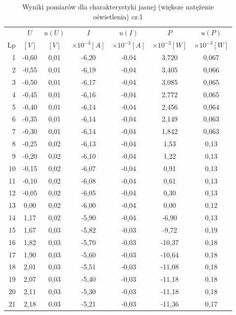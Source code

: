 \documentclass[polish, 11pt, a4paper]{article}
\begin{document}
		\begin{table}[H]
			\centering
			\caption{Wyniki pomiarów dla charakterystyki jasnej (większe natężenie oświetlenia) cz.1}
			\begin{tabular}{|r|c|c|c|c|c|c|}\hline
				&	\(U\)	&	\(u(U)\)	&	\(I\)	&	\(u(I)\)	&	\(P\)	&	\(u(P)\)	\\
				Lp	&	\([V]\)	&	\([V]\)	&	\(\times10^{-3} [A]\)	&	\(\times10^{-3} [A]\)	&	\(\times10^{-3} [W]\)	&	\(\times10^{-3} [W]\)	\\\hline
				1	&	-0,60	&	0,01	&	-6,20	&	-0,04	&	3,720	&	0,067	\\\hline
				2	&	-0,55	&	0,01	&	-6,19	&	-0,04	&	3,405	&	0,066	\\\hline
				3	&	-0,50	&	0,01	&	-6,17	&	-0,04	&	3,085	&	0,065	\\\hline
				4	&	-0,45	&	0,01	&	-6,16	&	-0,04	&	2,772	&	0,065	\\\hline
				5	&	-0,40	&	0,01	&	-6,14	&	-0,04	&	2,456	&	0,064	\\\hline
				6	&	-0,35	&	0,01	&	-6,14	&	-0,04	&	2,149	&	0,063	\\\hline
				7	&	-0,30	&	0,01	&	-6,14	&	-0,04	&	1,842	&	0,063	\\\hline
				8	&	-0,25	&	0,02	&	-6,13	&	-0,04	&	1,53	&	0,13	\\\hline
				9	&	-0,20	&	0,02	&	-6,10	&	-0,04	&	1,22	&	0,13	\\\hline
				10	&	-0,15	&	0,02	&	-6,07	&	-0,04	&	0,91	&	0,13	\\\hline
				11	&	-0,10	&	0,02	&	-6,08	&	-0,04	&	0,61	&	0,13	\\\hline
				12	&	-0,05	&	0,02	&	-6,05	&	-0,04	&	0,30	&	0,13	\\\hline
				13	&	0,00	&	0,02	&	-6,00	&	-0,04	&	0,00	&	0,12	\\\hline
				14	&	1,17	&	0,02	&	-5,90	&	-0,04	&	-6,90	&	0,13	\\\hline
				15	&	1,67	&	0,03	&	-5,82	&	-0,03	&	-9,72	&	0,19	\\\hline
				16	&	1,82	&	0,03	&	-5,70	&	-0,03	&	-10,37	&	0,18	\\\hline
				17	&	1,90	&	0,03	&	-5,60	&	-0,03	&	-10,64	&	0,18	\\\hline
				18	&	2,01	&	0,03	&	-5,51	&	-0,03	&	-11,08	&	0,18	\\\hline
				19	&	2,07	&	0,03	&	-5,40	&	-0,03	&	-11,18	&	0,18	\\\hline
				20	&	2,11	&	0,03	&	-5,30	&	-0,03	&	-11,18	&	0,18	\\\hline
				21	&	2,18	&	0,03	&	-5,21	&	-0,03	&	-11,36	&	0,17	\\\hline

\end{tabular}
\end{table}
\end{document}
